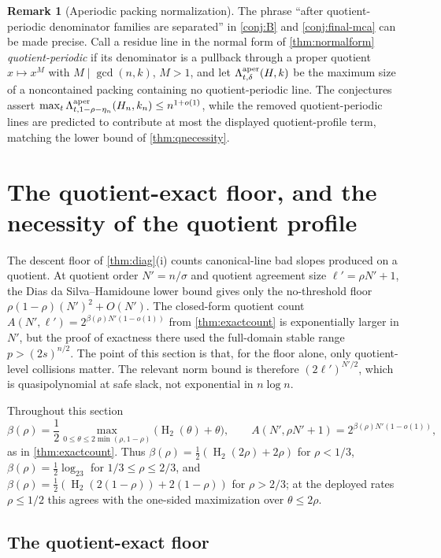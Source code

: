 \documentclass[11pt]{article}
\theoremstyle{definition}
\newtheorem{remark}[remark]{Remark}
\newcommand{\HH}{\operatorname{H}_2}
\newcommand{\Acl}{A}
\begin{document}
\begin{remark}[Aperiodic packing normalization]\label{rem:aper}
The phrase ``after quotient-periodic denominator families are separated'' in \cref{conj:B} and \cref{conj:final-mca} can be made precise.  Call a residue line in the normal form of \cref{thm:normalform} \emph{quotient-periodic} if its denominator is a pullback through a proper quotient $x\mapsto x^M$ with $M\mid\gcd(n,k)$, $M>1$, and let $\Lambda^{\rm aper}_{t,\delta}(H,k)$ be the maximum size of a noncontained packing containing no quotient-periodic line.  The conjectures assert $\max_t\Lambda^{\rm aper}_{t,1-\rho-\eta_n}(H_n,k_n)\le n^{1+o(1)}$, while the removed quotient-periodic lines are predicted to contribute at most the displayed quotient-profile term, matching the lower bound of \cref{thm:qnecessity}.
\end{remark}

\section{The quotient-exact floor, and the necessity of the quotient profile}\label{sec:qfloor}

The descent floor of \cref{thm:diag}(i) counts canonical-line bad slopes produced on a quotient.  At quotient order $N'=n/\sigma$ and quotient agreement size $\ell'=\rho N'+1$, the Dias da Silva--Hamidoune lower bound gives only the no-threshold floor $\rho(1-\rho)(N')^2+O(N')$.  The closed-form quotient count $\Acl(N',\ell')=2^{\beta(\rho)N'(1-o(1))}$ from \cref{thm:exactcount} is exponentially larger in $N'$, but the proof of exactness there used the full-domain stable range $p>(2s)^{n/2}$.  The point of this section is that, for the floor alone, only quotient-level collisions matter.  The relevant norm bound is therefore $(2\ell')^{N'/2}$, which is quasipolynomial at safe slack, not exponential in $n\log n$.

Throughout this section
\[
        \beta(\rho)=\frac12\max_{0\le\theta\le 2\min(\rho,1-\rho)}\bigl(\HH(\theta)+\theta\bigr),
        \qquad
        \Acl(N',\rho N'+1)=2^{\beta(\rho)N'(1-o(1))},
\]
as in \cref{thm:exactcount}.  Thus $\beta(\rho)=\frac12(\HH(2\rho)+2\rho)$ for $\rho<1/3$, $\beta(\rho)=\frac12\log_23$ for $1/3\le\rho\le2/3$, and $\beta(\rho)=\frac12(\HH(2(1-\rho))+2(1-\rho))$ for $\rho>2/3$; at the deployed rates $\rho\le1/2$ this agrees with the one-sided maximization over $\theta\le2\rho$.

\subsection{The quotient-exact floor}
\end{document}
